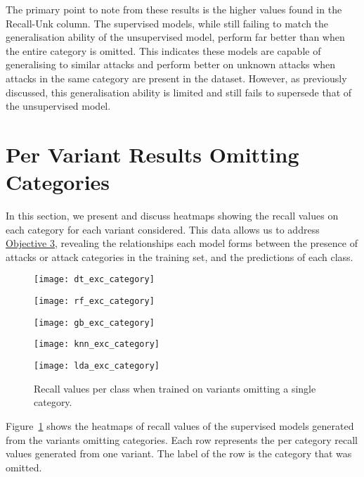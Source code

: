 The primary point to note from these results is the higher values found in the
Recall-Unk column. The supervised models, while still failing to match the
generalisation ability of the unsupervised model, perform far better than when
the entire category is omitted. This indicates these models are capable of
generalising to similar attacks and perform better on unknown attacks when
attacks in the same category are present in the dataset. However, as previously
discussed, this generalisation ability is limited and still fails to supersede
that of the unsupervised model.

\section{Per Variant Results Omitting Categories}%
\label{sec:res_var_cat}

In this section, we present and discuss heatmaps showing the recall values on
each category for each variant considered. This data allows us to address
\hyperlink{obj}{Objective 3}, revealing the relationships each model forms
between the presence of attacks or attack categories in the training set, and
the predictions of each class.

%
\begin{figure}[htbp]
    \centering
    \begin{minipage}[h]{0.5\textwidth}
        \centering
        \texttt{[image: dt\_exc\_category]}
    \end{minipage}\hfill
    \begin{minipage}[h]{0.5\textwidth}
        \centering
        \texttt{[image: rf\_exc\_category]}
    \end{minipage}
    \begin{minipage}[h]{0.5\textwidth}
        \centering
        \texttt{[image: gb\_exc\_category]}
    \end{minipage}\hfill
    \begin{minipage}[h]{0.5\textwidth}
        \centering
        \texttt{[image: knn\_exc\_category]}
    \end{minipage}
    \begin{minipage}[h]{0.5\textwidth}
        \centering
        \texttt{[image: lda\_exc\_category]}
    \end{minipage}
    \caption[Category Omission Results]{Recall values per class when trained on variants omitting a single category.\label{fig:exc_cat}}
\end{figure}
% 
Figure~\ref{fig:exc_cat} shows the heatmaps of recall values of the supervised
models generated from the variants omitting categories. Each row represents the
per category recall values generated from one variant. The label of the row is
the category that was omitted.

